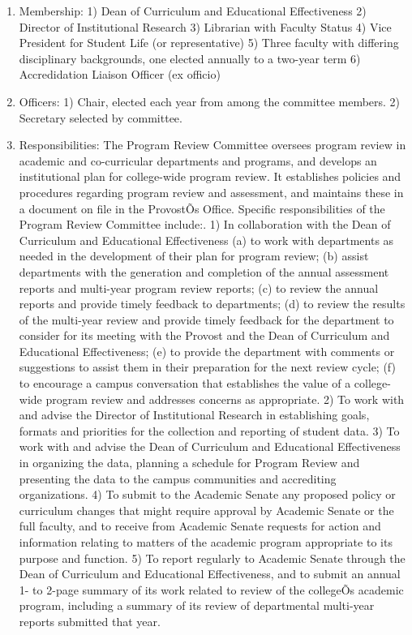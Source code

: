 \documentclass[letterpaper, 11pt]{article}
\begin{document}
				\begin{enumerate}[label=\alph*)]
					\item{Membership:}
					1) Dean of Curriculum and Educational Effectiveness
					2) Director of Institutional Research
					3) Librarian with Faculty Status
					4) Vice President for Student Life (or representative)
					5) Three faculty with differing disciplinary backgrounds, one elected annually to a two-year term
					6) Accredidation Liaison Officer (ex officio)
					\item{Officers:}
					1) Chair, elected each year from among the committee members.
					2) Secretary selected by committee.
					\item{Responsibilities:}
					The Program Review Committee oversees program review in academic and co-curricular departments and programs, and develops an institutional plan for college-wide program review.  It establishes policies and procedures regarding program review and assessment, and maintains these in a document on file in the ProvostÕs Office.  Specific responsibilities of the Program Review Committee include:.
					1) In collaboration with the Dean of Curriculum and Educational Effectiveness
					(a) to work with departments as needed in the development of their plan for program review;
					(b) assist departments with the generation and completion of the annual assessment reports and multi-year program review reports;
					(c) to review the annual reports and provide timely feedback to departments;
					(d) to review the results of the multi-year review and provide timely feedback for the department to consider for its meeting with the Provost and the Dean of Curriculum and Educational Effectiveness;
					(e) to provide the department with comments or suggestions to assist them in their preparation for the next review cycle;
					(f) to encourage a campus conversation that establishes the value of a college-wide program review and addresses concerns as appropriate.
					2) To work with and advise the Director of Institutional Research in establishing goals, formats and priorities for the collection and reporting of student data.
					3) To work with and advise the Dean of Curriculum and Educational Effectiveness in organizing the data, planning a schedule for Program Review and presenting the data to the campus communities and accrediting organizations.
					4) To submit to the Academic Senate any proposed policy or curriculum changes that might require approval by Academic Senate or the full faculty, and to receive from Academic Senate requests for action and information relating to matters of the academic program appropriate to its purpose and function.
					5) To report regularly to Academic Senate through the Dean of Curriculum and Educational Effectiveness, and to submit an annual 1- to 2-page summary of its work related to review of the collegeÕs academic program, including a summary of its review of departmental multi-year reports submitted that year.
				\end{enumerate}
\end{document}
